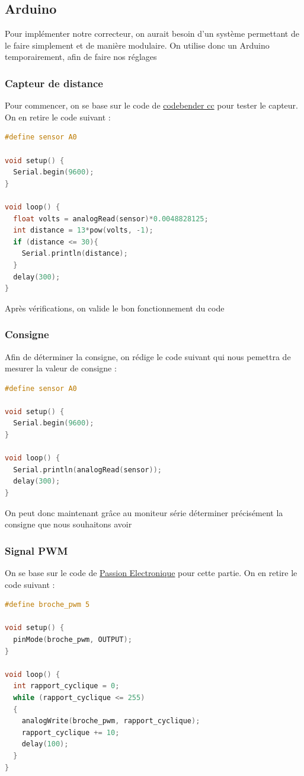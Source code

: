 \documentclass[11pt,a4paper]{article}
\begin{document}
\subsection{Arduino}
Pour implémenter notre correcteur, on aurait besoin d'un système permettant de le faire simplement et de manière modulaire. On utilise donc un Arduino temporairement, afin de faire nos réglages

\subsubsection{Capteur de distance}
Pour commencer, on se base sur le code de \href{https://www.instructables.com/How-to-Use-the-Sharp-IR-Sensor-GP2Y0A41SK0F-Arduin/}{codebender cc} pour tester le capteur. On en retire le code suivant : 
\begin{lstlisting}[language = C]
#define sensor A0

void setup() {
  Serial.begin(9600);
}

void loop() {
  float volts = analogRead(sensor)*0.0048828125;
  int distance = 13*pow(volts, -1);
  if (distance <= 30){
    Serial.println(distance);
  }
  delay(300);
}
\end{lstlisting}

Après vérifications, on valide le bon fonctionnement du code

\subsubsection{Consigne}
Afin de déterminer la consigne, on rédige le code suivant qui nous pemettra de mesurer la valeur de consigne :
\begin{lstlisting}[language = C]
#define sensor A0

void setup() {
  Serial.begin(9600);
}

void loop() {
  Serial.println(analogRead(sensor));
  delay(300);
}
\end{lstlisting}

On peut donc maintenant grâce au moniteur série déterminer précisément la consigne que nous souhaitons avoir

\subsubsection{Signal PWM}
On se base sur le code de \href{https://passionelectronique.fr/pwm-arduino/}{Passion Electronique} pour cette partie. On en retire le code suivant : 
\begin{lstlisting}[language = C]
#define broche_pwm 5

void setup() {
  pinMode(broche_pwm, OUTPUT);
}

void loop() {
  int rapport_cyclique = 0;  
  while (rapport_cyclique <= 255)
  {
    analogWrite(broche_pwm, rapport_cyclique);
    rapport_cyclique += 10;
    delay(100);
  }
}
\end{lstlisting}
\end{document}
